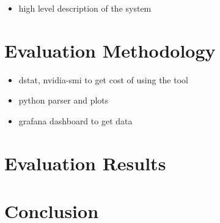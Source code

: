 \documentclass[conference]{IEEEtran}
\begin{document}
\begin{itemize}
    \item high level description of the system
\end{itemize}

\section{Evaluation Methodology}

\begin{itemize}
    \item dstat, nvidia-smi to get cost of using the tool
    \item python parser and plots
    \item grafana dashboard to get data 
\end{itemize}

\section{Evaluation Results}

\section{Conclusion}


\end{document}
